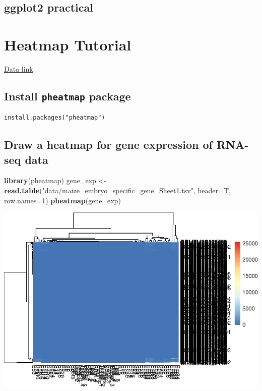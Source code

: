 \documentclass[]{book}
\makeatletter
\newenvironment{Shaded}{\begin{snugshade}}{\end{snugshade}}
\newcommand{\DataTypeTok}[1]{\textcolor[rgb]{0.13,0.29,0.53}{#1}}
\newcommand{\DecValTok}[1]{\textcolor[rgb]{0.00,0.00,0.81}{#1}}
\newcommand{\KeywordTok}[1]{\textcolor[rgb]{0.13,0.29,0.53}{\textbf{#1}}}
\newcommand{\NormalTok}[1]{#1}
\newcommand{\StringTok}[1]{\textcolor[rgb]{0.31,0.60,0.02}{#1}}
\newenvironment{kframe}{%
\medskip{}
\setlength{\fboxsep}{.8em}
 \def\at@end@of@kframe{}%
 \ifinner\ifhmode%
  \def\at@end@of@kframe{\end{minipage}}%
  \begin{minipage}{\columnwidth}%
 \fi\fi%
 \def\FrameCommand##1{\hskip\@totalleftmargin \hskip-\fboxsep
 \colorbox{shadecolor}{##1}\hskip-\fboxsep
     \hskip-\linewidth \hskip-\@totalleftmargin \hskip\columnwidth}%
 \MakeFramed {\advance\hsize-\width
   \@totalleftmargin\z@ \linewidth\hsize
   \@setminipage}}%
 {\par\unskip\endMakeFramed%
 \at@end@of@kframe}
\renewenvironment{Shaded}{\begin{kframe}}{\end{kframe}}
\makeatother
\begin{document}
\hypertarget{ggplot2-practical}{%
\section{ggplot2 practical}\label{ggplot2-practical}}

\hypertarget{heatmap-tutorial}{%
\chapter{Heatmap Tutorial}\label{heatmap-tutorial}}

\href{https://goo.gl/KLZ7N0}{Data link}

\hypertarget{install-pheatmap-package}{%
\section{\texorpdfstring{Install \texttt{pheatmap} package}{Install pheatmap package}}\label{install-pheatmap-package}}

\begin{verbatim}
install.packages("pheatmap")
\end{verbatim}

\hypertarget{draw-a-heatmap-for-gene-expression-of-rna-seq-data}{%
\section{Draw a heatmap for gene expression of RNA-seq data}\label{draw-a-heatmap-for-gene-expression-of-rna-seq-data}}

\begin{Shaded}
\begin{Highlighting}[]
\KeywordTok{library}\NormalTok{(pheatmap)}
\NormalTok{gene_exp <-}\StringTok{ }\KeywordTok{read.table}\NormalTok{(}\StringTok{"data/maize_embryo_specific_gene_Sheet1.tsv"}\NormalTok{, }\DataTypeTok{header=}\NormalTok{T, }\DataTypeTok{row.names=}\DecValTok{1}\NormalTok{)}
\KeywordTok{pheatmap}\NormalTok{(gene_exp)}
\end{Highlighting}
\end{Shaded}

\includegraphics{bioinfBookXIE186_files/figure-latex/unnamed-chunk-95-1.pdf}
\end{document}
